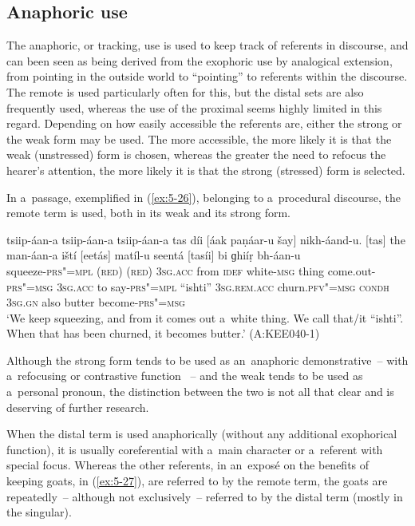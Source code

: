 \subsection{Anaphoric use}
\label{subsec:5-2-4}

The anaphoric, or tracking, use is used to keep track of referents in discourse, and can been seen as being derived from the exophoric use by analogical extension, from pointing in the outside world to ``pointing'' to referents within the discourse. The remote is used particularly often for this, but the distal sets are also frequently used, whereas the use of the proximal seems highly limited in this regard. Depending on how easily accessible the referents are, either the strong or the weak form may be used. The more accessible, the more likely it is that the weak (unstressed) form is chosen, whereas the greater the need to refocus the hearer's attention, the more likely it is that the strong (stressed) form is selected. 


In a~passage, exemplified in (\ref{ex:5-26}), belonging to a~procedural discourse, the remote term is used, both in its weak and its strong form.


\begin{exe}
\ex
\label{ex:5-26}
\gll tsiip-áan-a tsiip-áan-a tsiip-áan-a tas díi [áak paṇáar-u
 šay] nikh-áand-u. [tas] the man-áan-a iští [eetás] matíl-u
seentá [tasíi] bi ɡhiíṛ bh-áan-u \\
squeeze-\textsc{prs"=mpl} (\textsc{red}) (\textsc{red}) \textsc{3sg.acc} from
\textsc{idef} white-\textsc{msg} thing come.out-\textsc{prs"=msg} \textsc{3sg.acc}
to say-\textsc{prs"=mpl} ``ishti'' \textsc{3sg.rem.acc} churn.\textsc{pfv"=msg}
\textsc{condh} \textsc{3sg.gn} also butter become-\textsc{prs"=msg}\\
\glt `We keep squeezing, and from it comes out a~white thing. We call that/it ``ishti''. When that has been
churned, it becomes butter.' (A:KEE040-1)
\end{exe}

Although the strong form tends to be used as an~anaphoric demonstrative~-- with a~refocusing or contrastive function \citep[432]{diessel2006}~-- and the weak tends to be used as a~personal pronoun, the distinction between the two is not all that clear and is deserving of further research.

When the distal term is used anaphorically (without any additional exophorical function), it is usually coreferential with a~main character or a~referent with special focus. Whereas the other referents, in an~exposé on the benefits of keeping goats, in (\ref{ex:5-27}), are referred to by the remote term, the goats are repeatedly~-- although not exclusively~-- referred to by the distal term (mostly in the singular). 

